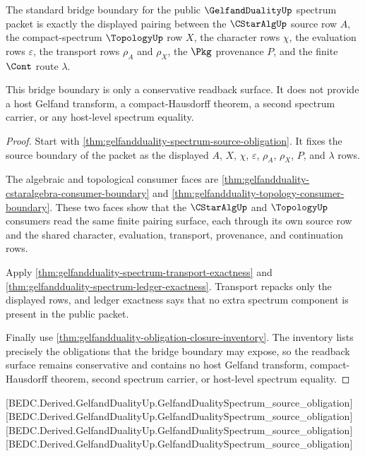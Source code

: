 \begin{theorem}
\label{thm:gelfandduality-standard-spectrum-bridge-boundary}
The standard bridge boundary for the public $\GelfandDualityUp$ spectrum packet
is exactly the displayed pairing between the $\CStarAlgUp$ source row $A$, the
compact-spectrum $\TopologyUp$ row $X$, the character rows $\chi$, the
evaluation rows $\varepsilon$, the transport rows $\rho_{A}$ and $\rho_{X}$,
the $\Pkg$ provenance $P$, and the finite $\Cont$ route $\lambda$.

This bridge boundary is only a conservative readback surface. It does not
provide a host Gelfand transform, a compact-Hausdorff theorem, a second spectrum
carrier, or any host-level spectrum equality.
\end{theorem}
\begin{proof}
Start with \autoref{thm:gelfandduality-spectrum-source-obligation}. It fixes
the source boundary of the packet as the displayed $A$, $X$, $\chi$,
$\varepsilon$, $\rho_{A}$, $\rho_{X}$, $P$, and $\lambda$ rows.

The algebraic and topological consumer faces are
\autoref{thm:gelfandduality-cstaralgebra-consumer-boundary} and
\autoref{thm:gelfandduality-topology-consumer-boundary}. These two faces show
that the $\CStarAlgUp$ and $\TopologyUp$ consumers read the same finite pairing
surface, each through its own source row and the shared character, evaluation,
transport, provenance, and continuation rows.

Apply \autoref{thm:gelfandduality-spectrum-transport-exactness} and
\autoref{thm:gelfandduality-spectrum-ledger-exactness}. Transport repacks only
the displayed rows, and ledger exactness says that no extra spectrum component
is present in the public packet.

Finally use \autoref{thm:gelfandduality-obligation-closure-inventory}. The
inventory lists precisely the obligations that the bridge boundary may expose,
so the readback surface remains conservative and contains no host Gelfand
transform, compact-Hausdorff theorem, second spectrum carrier, or host-level
spectrum equality.
\end{proof}

[BEDC.Derived.GelfandDualityUp.GelfandDualitySpectrum\_source\_obligation]
[BEDC.Derived.GelfandDualityUp.GelfandDualitySpectrum\_source\_obligation]
[BEDC.Derived.GelfandDualityUp.GelfandDualitySpectrum\_source\_obligation]
[BEDC.Derived.GelfandDualityUp.GelfandDualitySpectrum\_source\_obligation]

